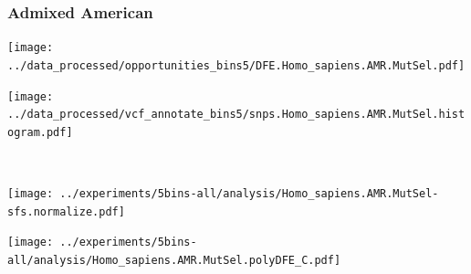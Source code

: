 \subsubsection{Admixed American}

\begin{minipage}{0.49\linewidth}
    \texttt{[image: ../data\_processed/opportunities\_bins5/DFE.Homo\_sapiens.AMR.MutSel.pdf]}
\end{minipage}
\begin{minipage}{0.49\linewidth}
    \texttt{[image: ../data\_processed/vcf\_annotate\_bins5/snps.Homo\_sapiens.AMR.MutSel.histogram.pdf]}
\end{minipage}
\\
\begin{minipage}{0.49\linewidth}
    \texttt{[image: ../experiments/5bins-all/analysis/Homo\_sapiens.AMR.MutSel-sfs.normalize.pdf]}
\end{minipage}
\begin{minipage}{0.4\linewidth}
    \texttt{[image: ../experiments/5bins-all/analysis/Homo\_sapiens.AMR.MutSel.polyDFE\_C.pdf]}
\end{minipage}
